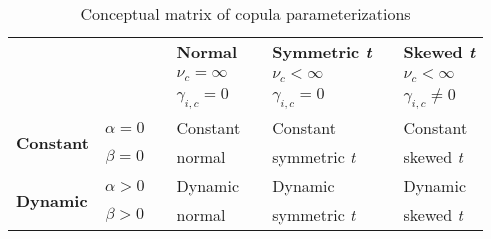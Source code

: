 
\begin{table}
  \centering
  \footnotesize
  \renewcommand{\arraystretch}{1.2}

  \caption{Conceptual matrix of copula parameterizations}

  \begin{tabularx}{0.80\textwidth}{@{} lc c >{\centering}Xc >{\centering}Xc >{\centering\arraybackslash}X}
    \toprule
      & && \textbf{Normal} && \textbf{Symmetric \emph{t}} && \textbf{Skewed \emph{t}} \\
      \cmidrule{4-4}
      \cmidrule{6-6}
      \cmidrule{8-8}
      & && $\nu_c = \infty$   && $\nu_c < \infty$   && $\nu_c < \infty$ \\
      & && $\gamma_{i,c} = 0$ && $\gamma_{i,c} = 0$ && $\gamma_{i,c} \neq 0$ \\
      \cmidrule{4-8}
    \cmidrule{1-2}
    \multirow{2}{*}{\textbf{Constant}} & $\alpha = 0$ && Constant && Constant && Constant \\
                              & $\beta = 0$  && normal   && symmetric \emph{t} && skewed \emph{t}      \\
    \cmidrule{1-2}
    \multirow{2}{*}{\textbf{Dynamic}}  & $\alpha > 0$ && Dynamic  && Dynamic && Dynamic \\
                              & $\beta > 0$  && normal   && symmetric \emph{t} && skewed \emph{t}      \\
    \bottomrule
  \end{tabularx}

\end{table}

